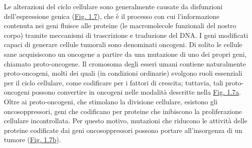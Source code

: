 \documentclass[12pt,a4paper,twoside]{report}
\begin{document}
	Le alterazioni del ciclo cellulare sono generalmente causate da disfunzioni dell'espressione genica (\hyperref[fig:mutazioni_genetiche]{Fig. 1.7}), che è il processo con cui l'informazione contenuta nei geni fluisce alle proteine (le macromolecole funzionali del nostro corpo) tramite meccanismi di trascrizione e traduzione del DNA. I geni modificati capaci di generare cellule tumorali sono denominati oncogeni. Di solito le cellule sane acquisiscono un oncogene a partire da una mutazione di uno dei propri geni, chiamato proto-oncogene. Il cromosoma degli esseri umani contiene naturalmente proto-oncogeni, molti dei quali (in condizioni ordinarie) svolgono ruoli essenziali per il ciclo cellulare, come codificare per i fattori di crescita; tuttavia, tali proto-oncogeni possono convertire in oncogeni nelle modalità descritte nella \hyperref[fig:oncogene]{Fig. 1.7a}. Oltre ai proto-oncogeni, che stimolano la divisione cellulare, esistono gli oncosoppressori, geni che codificano per proteine che inibiscono la proliferazione cellulare incontrollata. Per questo motivo, mutazioni che riducono le attività delle proteine codificate dai geni oncosoppressori possono portare all'insorgenza di un tumore (\hyperref[fig:oncosoppressore]{Fig. 1.7b}).
\end{document}
